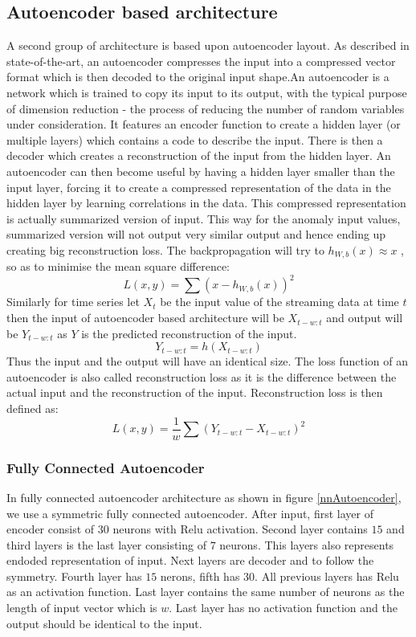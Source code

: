 \documentclass[12pt]{article}
\begin{document}
\subsection{Autoencoder based architecture}
A second group of architecture is based upon autoencoder layout. As described in state-of-the-art, an autoencoder compresses the input into a compressed vector format which is then decoded to the original input shape.An autoencoder is a network which is trained to copy its input to its output, with the typical purpose of dimension reduction - the process of reducing the number of random variables under consideration. It features an encoder function to create a hidden layer (or multiple layers) which contains a code to describe the input. There is then a decoder which creates a reconstruction of the input from the hidden layer. An autoencoder can then become useful by having a hidden layer smaller than the input layer, forcing it to create a compressed representation of the data in the hidden layer by learning correlations in the data. This compressed representation is actually summarized version of input. This way for the anomaly input values, summarized version will not output very similar output and hence ending up creating big reconstruction loss.
The backpropagation will try to  $h_{W,b}(x) \approx x$ , so as to minimise the mean square difference:
\begin{equation}
L(x,y) = \sum(x-h_{W,b}(x))^2
\end{equation}
Similarly for time series let $X_t$ be the input value of the streaming data at time $t$ then the input of autoencoder based architecture will be $X_{t-w:t}$ and output will be $Y_{t-w:t}$ as $Y$ is the predicted reconstruction of the input. 
\begin{equation}
Y_{t-w:t} = h(X_{t-w:t})
\end{equation}
Thus the input and the output will have an identical size. The loss function of an autoencoder is also called reconstruction loss as it is the difference between the actual input and the reconstruction of the input. Reconstruction loss is then defined as:
\begin{equation}
L(x,y) = \frac{1}{w}\sum(Y_{t-w:t}-X_{t-w:t})^2
\end{equation}
\newpage
\subsubsection{Fully Connected Autoencoder}
In fully connected autoencoder architecture as shown in figure \ref{nnAutoencoder}, we use a symmetric fully connected autoencoder. After input, first layer of encoder consist of $30$ neurons with Relu activation. Second layer contains $15$ and third layers is the last layer consisting of $7$ neurons. This layers also represents endoded representation of input. Next layers are decoder and to follow the symmetry. Fourth layer has $15$ nerons, fifth has $30$. All previous layers has Relu as an activation function. Last layer contains the same number of neurons as the length of input vector which is $w$. Last layer has no activation function and the output should be identical to the input.
\end{document}
